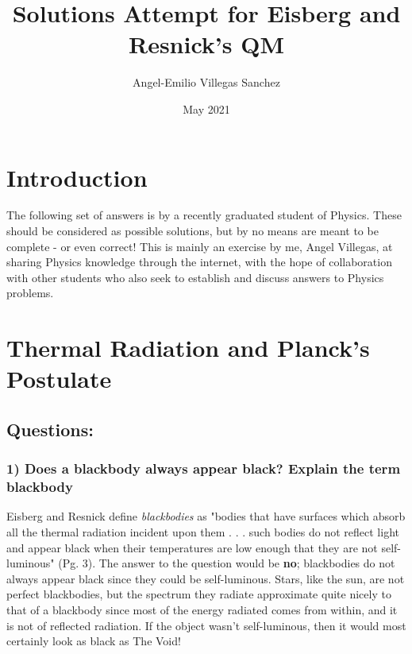 \documentclass{report}
\title{Solutions Attempt for Eisberg and Resnick's QM}
\author{Angel-Emilio Villegas Sanchez}
\date{May 2021}
\begin{document}
\maketitle
\chapter*{Introduction}
The following set of answers is by a recently graduated student of Physics. These should be considered as possible  solutions, but by no means are meant to be complete - or even correct! This is mainly an exercise by me, Angel Villegas, at sharing Physics knowledge through the internet, with the hope of collaboration with other students who also seek to establish and discuss answers to Physics problems.   
\chapter{Thermal Radiation and Planck's Postulate}

\section*{Questions:}
\subsection*{1) Does a blackbody always appear black? Explain the term blackbody}
Eisberg and Resnick define \textit{blackbodies} as "bodies that have surfaces which absorb all the thermal radiation incident upon them . . . such bodies do not reflect light and appear black when their temperatures are low enough that they are not self-luminous" (Pg. 3). The answer to the question would be \textbf{no}; blackbodies do not always appear black since they could be self-luminous. Stars, like the sun, are not perfect blackbodies, but the spectrum they radiate approximate quite nicely to that of a blackbody since most of the energy radiated comes from within, and it is not of reflected radiation. If the object wasn't self-luminous, then it would most certainly look as black as The Void!
\end{document}
